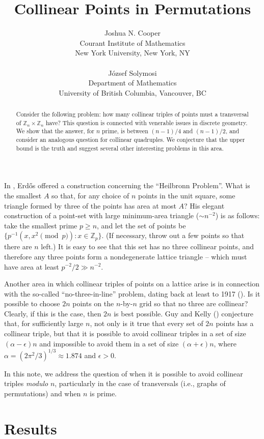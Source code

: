 \documentclass[12pt]{article}
\title{Collinear Points in Permutations}
\author{Joshua N. Cooper \\ \small Courant Institute of Mathematics \\ \small New York University, New York, NY \\ \\ J\'{o}zsef Solymosi \\ \small Department of Mathematics \\ \small University of British Columbia, Vancouver, BC}
\newcommand{\Z}{{\mathbb Z}}
\begin{document}
\maketitle

\begin{abstract} Consider the following problem: how many collinear triples of points must a transversal of $\Z_n \times \Z_n$ have?  This question is connected with venerable issues in discrete geometry.  We show that the answer, for $n$ prime, is between $(n-1)/4$ and $(n-1)/2$, and consider an analogous question for collinear quadruples.  We conjecture that the upper bound is the truth and suggest several other interesting problems in this area.
\end{abstract}

In \cite{R51}, Erd\H{o}s offered a construction concerning the ``Heilbronn Problem''.  What is the smallest $A$ so that, for any choice of $n$ points in the unit square, some triangle formed by three of the points has area at most $A$?  His elegant construction of a point-set with large minimum-area triangle ($\sim n^{-2}$) is as follows: take the smallest prime $p \geq n$, and let the set of points be $\{p^{-1}(x,x^2 \pmod{p}): x \in \Z_p\}$.  (If necessary, throw out a few points so that there are $n$ left.) It is easy to see that this set has no three collinear points, and therefore any three points form a nondegenerate lattice triangle -- which must have area at least $p^{-2}/2 \gg n^{-2}$.

Another area in which collinear triples of points on a lattice arise is in connection with the so-called ``no-three-in-line'' problem, dating back at least to 1917 (\cite{D17}).  Is it possible to choose $2n$ points on the $n$-by-$n$ grid so that no three are collinear?  Clearly, if this is the case, then $2n$ is best possible.  Guy and Kelly (\cite{GK68}) conjecture that, for sufficiently large $n$, not only is it true that every set of $2n$ points has a collinear triple, but that it is possible to avoid collinear triples in a set of size $(\alpha - \epsilon)n$ and impossible to avoid them in a set of size $(\alpha + \epsilon)n$, where $\alpha = (2\pi^2/3)^{1/3} \approx 1.874$ and $\epsilon > 0$.

In this note, we address the question of when it is possible to avoid collinear triples {\it modulo} $n$, particularly in the case of transversals (i.e., graphs of permutations) and when $n$ is prime.

\section{Results}
\end{document}
